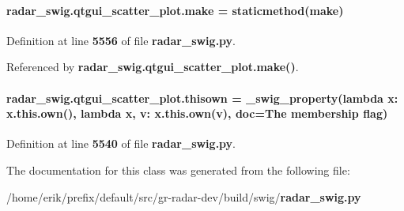 \paragraph[{make}]{\setlength{\rightskip}{0pt plus 5cm}radar\+\_\+swig.\+qtgui\+\_\+scatter\+\_\+plot.\+make = staticmethod(make)\hspace{0.3cm}{\ttfamily [static]}}\label{classradar__swig_1_1qtgui__scatter__plot_aabc3eeb69ddb90c2b2a28f09f154f50f}


Definition at line {\bf 5556} of file {\bf radar\+\_\+swig.\+py}.



Referenced by {\bf radar\+\_\+swig.\+qtgui\+\_\+scatter\+\_\+plot.\+make()}.

\paragraph[{thisown}]{\setlength{\rightskip}{0pt plus 5cm}radar\+\_\+swig.\+qtgui\+\_\+scatter\+\_\+plot.\+thisown = {\bf \+\_\+swig\+\_\+property}(lambda x\+: x.\+this.\+own(), lambda {\bf x}, v\+: x.\+this.\+own(v), doc=\textquotesingle{}The membership flag\textquotesingle{})\hspace{0.3cm}{\ttfamily [static]}}\label{classradar__swig_1_1qtgui__scatter__plot_a04b356d0d49e6464b130874bbbfe6ceb}


Definition at line {\bf 5540} of file {\bf radar\+\_\+swig.\+py}.



The documentation for this class was generated from the following file\+:\begin{DoxyCompactItemize}
\item 
/home/erik/prefix/default/src/gr-\/radar-\/dev/build/swig/{\bf radar\+\_\+swig.\+py}\end{DoxyCompactItemize}
